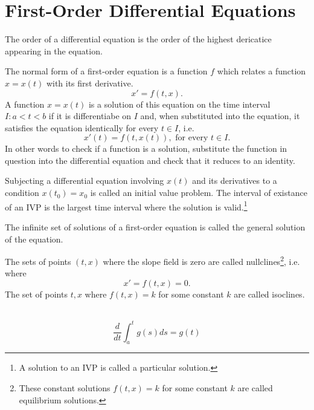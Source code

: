 \documentclass[nobib,notoc]{tufte-handout}
\begin{document}
\section{First-Order Differential Equations}
\begin{defi}[Order]
	The order of a differential equation is the order of the highest dericatice appearing in the equation.
\end{defi}
\begin{defi}
	The normal form of a first-order equation is a function \(f\) which relates a function \(x=x(t)\) with its first derivative.
	\begin{equation*}
		x'=f(t,x).
	\end{equation*}
	A function \(x=x(t)\) is a solution of this equation on the time interval \(I:a<t<b\) if it is differentiabe on \(I\) and, when substituted into the equation, it satisfies the equation identically for every \(t\in I\), i.e.
	\begin{equation*}
		x'(t)=f(t,x(t)),\text{ for every }t\in I.
	\end{equation*}
	In other words to check if a function is a solution, substitute the function in question into the differential equation and check that it reduces to an identity.
\end{defi}
\begin{defi}
	Subjecting a differential equation involving \(x(t)\) and its derivatives to a condition \(x(t_0)=x_0\) is called an initial value problem. The interval of existance of an IVP is the largest time interval where the solution is valid.\footnote{A solution to an IVP is called a particular solution.}
\end{defi}
\begin{defi}
	The infinite set of solutions of a first-order equation is called the general solution of the equation.
\end{defi}
\begin{defi}
	The sets of points \((t,x)\) where the slope field is zero are called nullclines\footnote{These constant solutions \(f(t,x)=k\) for some constant \(k\) are called equilibrium solutions.}, i.e. where
	\begin{equation*}
		x'=f(t,x)=0.
	\end{equation*}
	The set of points \(t,x\) where \(f(t,x)=k\) for some constant \(k\) are called isoclines.
\end{defi}
\begin{thm}
	\,
	\begin{equation*}
		\frac{d}{dt}\int_{a}^{t}g(s)ds=g(t)
	\end{equation*}
\end{thm}
\end{document}
